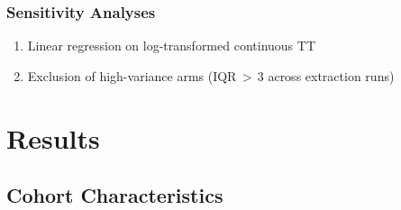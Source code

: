 \documentclass[11pt,a4paper]{article}
\begin{document}
\subsubsection{Sensitivity Analyses}
\begin{enumerate}
    \item Linear regression on log-transformed continuous TT
    \item Exclusion of high-variance arms (IQR\,$>$\,3 across extraction runs)
\end{enumerate}

\section{Results}

\subsection{Cohort Characteristics}
\end{document}
